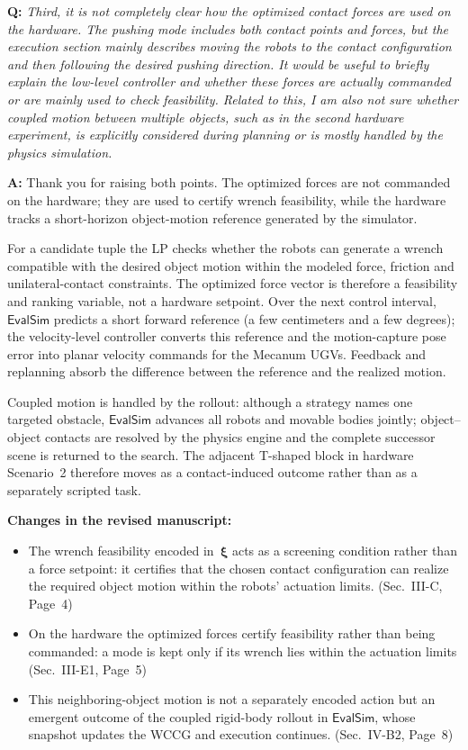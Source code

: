 \documentclass[11pt]{article}
\newcommand{\change}[1]{{\color{blue}#1}}
\begin{document}
\begin{shaded*}
\noindent \textbf{Q:}
{\itshape
Third, it is not completely clear how the optimized contact forces are
used on the hardware. The pushing mode includes both contact points and
forces, but the execution section mainly describes moving the robots to
the contact configuration and then following the desired pushing
direction. It would be useful to briefly explain the low-level
controller and whether these forces are actually commanded or are
mainly used to check feasibility. Related to this, I am also not sure
whether coupled motion between multiple objects, such as in the second
hardware experiment, is explicitly considered during planning or is
mostly handled by the physics simulation.
}
\end{shaded*}

\noindent \textbf{A:}
Thank you for raising both points. The optimized forces are not commanded on
the hardware; they are used to certify wrench feasibility, while the hardware
tracks a short-horizon object-motion reference generated by the simulator.

For a candidate tuple the LP checks whether the robots can generate a wrench compatible with the
desired object motion within the modeled force, friction and unilateral-contact constraints. The optimized force vector is
therefore a feasibility and ranking variable, not a hardware setpoint. Over the
next control interval, $\mathsf{EvalSim}$ predicts a short forward reference
(a few centimeters and a few degrees); the velocity-level controller converts
this reference and the motion-capture pose error into planar velocity commands
for the Mecanum UGVs. Feedback and replanning absorb the difference between the
reference and the realized motion.

Coupled motion is handled by the rollout: although a strategy names one targeted obstacle, $\mathsf{EvalSim}$ advances all robots and movable bodies jointly; object--object contacts are resolved by the physics
engine and the complete successor scene is returned to the search. The adjacent
T-shaped block in hardware Scenario~2 therefore moves as a contact-induced
outcome rather than as a separately scripted task.

\noindent\textbf{Changes in the revised manuscript:}

\begin{itemize}
\item \change{The wrench feasibility encoded in~$\boldsymbol{\xi}$ acts as a screening condition rather than a force setpoint: it certifies that the chosen contact configuration can realize the required object motion within the robots' actuation limits.} (Sec.~III-C, Page~4)
\item \change{On the hardware the optimized forces certify feasibility rather than being commanded: a mode is kept only if its wrench lies within the actuation limits} (Sec.~III-E1, Page~5)
\item \change{This neighboring-object motion is not a separately encoded action but an emergent outcome of the coupled rigid-body rollout in $\mathsf{EvalSim}$, whose snapshot updates the WCCG and execution continues.} (Sec.~IV-B2, Page~8)
\end{itemize}
\end{document}
